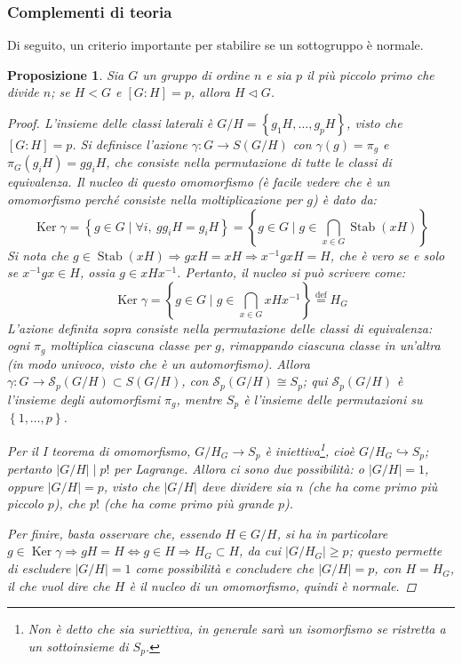 \documentclass[11pt]{scrartcl}
\theoremstyle{style1}
\newtheorem{prop}{Proposizione}[section]
\numberwithin{equation}{subsection}
\begin{document}
\subsubsection{Complementi di teoria}
Di seguito, un criterio importante per stabilire se un sottogruppo \`e normale.
\begin{prop}\label{propnlag}
	Sia $G$ un gruppo di ordine $n$ e sia $p$ il pi\`u piccolo primo che divide $n$; se $H < G$ e $[G : H ] = p$, allora $H \lhd G$.
	\begin{proof}
		L'insieme delle classi laterali \`e $G / H = \left\{ g_1H , \ldots, g_p H \right\} $, visto che $[G:H] = p$.
		Si definisce l'azione $\gamma: G \to S(G / H)$ con $\gamma(g) = \pi _g$ e $\pi_G (g_i H) = gg_i H$, che consiste nella permutazione di tutte le classi di equivalenza.
		Il nucleo di questo omomorfismo (\`e facile vedere che \`e un omomorfismo perch\'e consiste nella moltiplicazione per $g$) \`e dato da:
		\[
			\operatorname{Ker} \gamma = \left\{ g \in  G  \mid \forall i, \ g g_{i} H = g_i H \right\} = \left\{ g \in  G  \mid g \in \bigcap _{x \in G} \operatorname{Stab} (xH) \right\} 
		\] 
		Si nota che $g \in \operatorname{Stab} (xH) \Rightarrow gx H = xH \Rightarrow x^{-1}gx H = H$, che \`e vero se e solo se $x^{-1}g x \in H$, ossia $g \in  x H x^{-1}$.
		Pertanto, il nucleo si pu\`o scrivere come:
		\[
		\operatorname{Ker} \gamma = \left\{ g \in  G  \mid g \in \bigcap_{x \in  G}  xH x^{-1}  \right\} \overset{\text{def}}{=}H_G
		\] 
		L'azione definita sopra consiste nella permutazione delle classi di equivalenza: ogni $\pi_g$ moltiplica ciascuna classe per $g$, rimappando ciascuna classe in un'altra (in modo univoco, visto che \`e un automorfismo). 
		Allora $\gamma : G \to \mathcal{S} _p (G / H) \subset S(G/H)$, con $\mathcal{S}_p (G / H) \cong S_p$; qui $\mathcal{S}_p(G / H) $ \`e l'insieme degli automorfismi $\pi_g$, mentre $S_p$ \`e l'insieme delle permutazioni su $\left\{ 1, \ldots, p  \right\} $.

		Per il I teorema di omomorfismo, $G / H_G \longrightarrow S_p$ \`e iniettiva\footnote{Non \`e detto che sia suriettiva, in generale sar\`a un isomorfismo se ristretta a un sottoinsieme di $S_p$.}, cio\`e $G / H_G \hookrightarrow S_p$; pertanto $\lvert G / H \rvert  \mid p !$ per Lagrange.
		Allora ci sono due possibilit\`a: o $\lvert G / H \rvert  =1 $, oppure $\lvert G / H \rvert = p$, visto che $\lvert G / H \rvert $ deve dividere sia $n$ (che ha come primo pi\`u piccolo $p$), che $p!$ (che ha come primo pi\`u grande $p$).

		Per finire, basta osservare che, essendo $H \in G / H$, si ha in particolare $g \in \operatorname{Ker} \gamma\Rightarrow gH = H \iff g \in  H \Rightarrow  H_G \subset H$, da cui $\lvert G / H_G \rvert\ge p $; questo permette di escludere $\lvert G / H \rvert  =1$ come possibilit\`a e concludere che $\lvert G / H \rvert = p$, con $H = H_G$, il che vuol dire che $H$ \`e il nucleo di un omomorfismo, quindi \`e normale.
	\end{proof}
\end{prop}
\end{document}
